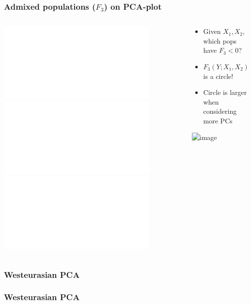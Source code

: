 \documentclass[11pt]{beamer}
\begin{document}
\begin{frame}
\frametitle{Admixed populations ($F_3$) on PCA-plot}
\begin{columns}
	\begin{column}{0.4\textwidth}
		\includegraphics<1>{figures/f3_on_pca_1b.pdf}
		\includegraphics<2-4>{figures/f3_on_pca_1.pdf}		
		\includegraphics<5>{figures/f3_on_pca_1d.pdf}				
	\end{column}
	\begin{column}{0.6\textwidth}
		\begin{itemize}
			\item<1-> Given $X_1, X_2$, which pops have $F_3 < 0$?	
			\item<2-> $F_3(Y; X_1, X_2) = 0$ is a circle!
			\item<5> Circle is larger when considering more PCs
		\end{itemize}
	
		\includegraphics<4>[width=\textwidth]{figures/mcvean2009_fig4b.png}
	\end{column}
\end{columns}
\end{frame}

\begin{frame}
	\frametitle{Westeurasian PCA}
\end{frame}
\begin{frame}
	\frametitle{Westeurasian PCA}
\end{frame}
\end{document}
